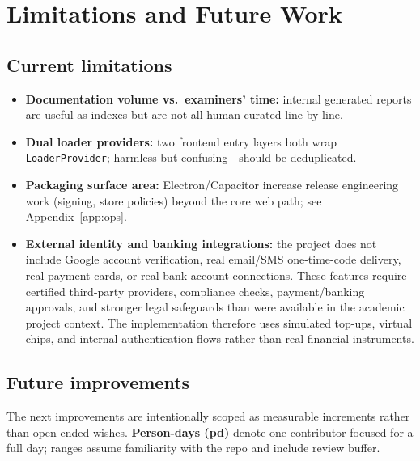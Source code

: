 \documentclass[11pt,a4paper]{article}
\begin{document}
\section{Limitations and Future Work}
\label{sec:limitations}

\subsection{Current limitations}

\begin{itemize}
\item \textbf{Documentation volume vs.\ examiners' time:} internal generated reports are useful as indexes but are not all human-curated line-by-line.
\item \textbf{Dual loader providers:} two frontend entry layers both wrap \texttt{LoaderProvider}; harmless but confusing---should be deduplicated.
\item \textbf{Packaging surface area:} Electron/Capacitor increase release engineering work (signing, store policies) beyond the core web path; see Appendix~\ref{app:ops}.
\item \textbf{External identity and banking integrations:} the project does not include Google account verification, real email/SMS one-time-code delivery, real payment cards, or real bank account connections. These features require certified third-party providers, compliance checks, payment/banking approvals, and stronger legal safeguards than were available in the academic project context. The implementation therefore uses simulated top-ups, virtual chips, and internal authentication flows rather than real financial instruments.
\end{itemize}

\subsection{Future improvements}

The next improvements are intentionally scoped as measurable increments rather than open-ended wishes. \textbf{Person-days (pd)} denote one contributor focused for a full day; ranges assume familiarity with the repo and include review buffer.
\end{document}

